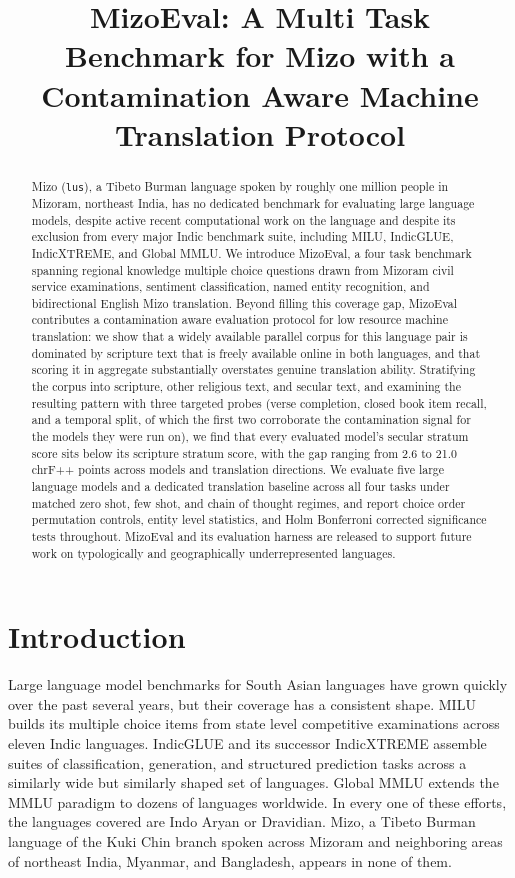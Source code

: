 \documentclass[11pt,a4paper]{article}
\title{MizoEval: A Multi Task Benchmark for Mizo with a Contamination Aware Machine Translation Protocol}
\author{}
\date{}
\begin{document}
\maketitle

\begin{abstract}
Mizo (\texttt{lus}), a Tibeto Burman language spoken by roughly one million people in Mizoram, northeast India, has no dedicated benchmark for evaluating large language models, despite active recent computational work on the language and despite its exclusion from every major Indic benchmark suite, including MILU, IndicGLUE, IndicXTREME, and Global MMLU. We introduce MizoEval, a four task benchmark spanning regional knowledge multiple choice questions drawn from Mizoram civil service examinations, sentiment classification, named entity recognition, and bidirectional English Mizo translation. Beyond filling this coverage gap, MizoEval contributes a contamination aware evaluation protocol for low resource machine translation: we show that a widely available parallel corpus for this language pair is dominated by scripture text that is freely available online in both languages, and that scoring it in aggregate substantially overstates genuine translation ability. Stratifying the corpus into scripture, other religious text, and secular text, and examining the resulting pattern with three targeted probes (verse completion, closed book item recall, and a temporal split, of which the first two corroborate the contamination signal for the models they were run on), we find that every evaluated model's secular stratum score sits below its scripture stratum score, with the gap ranging from 2.6 to 21.0 chrF++ points across models and translation directions. We evaluate five large language models and a dedicated translation baseline across all four tasks under matched zero shot, few shot, and chain of thought regimes, and report choice order permutation controls, entity level statistics, and Holm Bonferroni corrected significance tests throughout. MizoEval and its evaluation harness are released to support future work on typologically and geographically underrepresented languages.
\end{abstract}

\section{Introduction}

Large language model benchmarks for South Asian languages have grown quickly over the past several years, but their coverage has a consistent shape. MILU builds its multiple choice items from state level competitive examinations across eleven Indic languages. IndicGLUE and its successor IndicXTREME assemble suites of classification, generation, and structured prediction tasks across a similarly wide but similarly shaped set of languages. Global MMLU extends the MMLU paradigm to dozens of languages worldwide. In every one of these efforts, the languages covered are Indo Aryan or Dravidian. Mizo, a Tibeto Burman language of the Kuki Chin branch spoken across Mizoram and neighboring areas of northeast India, Myanmar, and Bangladesh, appears in none of them.
\end{document}
